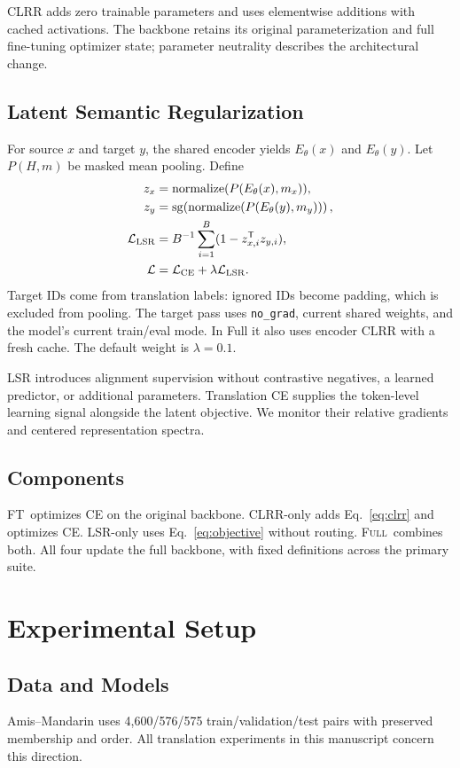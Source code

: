 \documentclass[11pt]{article}
\newcommand{\sg}{\operatorname{sg}}
\newcommand{\Full}{\textsc{Full}}
\newcommand{\FT}{\textsc{FT}}
\begin{document}
CLRR adds zero trainable parameters and uses elementwise additions with cached activations. The backbone retains its original parameterization and full fine-tuning optimizer state; parameter neutrality describes the architectural change.

\subsection{Latent Semantic Regularization}
For source $x$ and target $y$, the shared encoder yields $E_\theta(x)$ and $E_\theta(y)$. Let $P(H,m)$ be masked mean pooling. Define
\begin{align}
z_x &= \operatorname{normalize}(P(E_\theta(x),m_x)),\\
z_y &= \sg\!\left(\operatorname{normalize}(P(E_\theta(y),m_y))\right),\\
\mathcal L_{\rm LSR} &= B^{-1}\sum_{i=1}^B(1-z_{x,i}^{\mathsf T}z_{y,i}),\\
\mathcal L &= \mathcal L_{\rm CE}+\lambda\mathcal L_{\rm LSR}.
\label{eq:objective}
\end{align}
Target IDs come from translation labels: ignored IDs become padding, which is excluded from pooling. The target pass uses \texttt{no\_grad}, current shared weights, and the model's current train/eval mode. In Full it also uses encoder CLRR with a fresh cache. The default weight is $\lambda=0.1$.

LSR introduces alignment supervision without contrastive negatives, a learned predictor, or additional parameters. Translation CE supplies the token-level learning signal alongside the latent objective. We monitor their relative gradients and centered representation spectra.

\subsection{Components}
\FT\ optimizes CE on the original backbone. CLRR-only adds Eq.~\ref{eq:clrr} and optimizes CE. LSR-only uses Eq.~\ref{eq:objective} without routing. \Full\ combines both. All four update the full backbone, with fixed definitions across the primary suite.

\section{Experimental Setup}
\subsection{Data and Models}
Amis--Mandarin \citep{zheng-etal-2022-parallel} uses 4,600/576/575 train/validation/test pairs with preserved membership and order. All translation experiments in this manuscript concern this direction.
\end{document}
